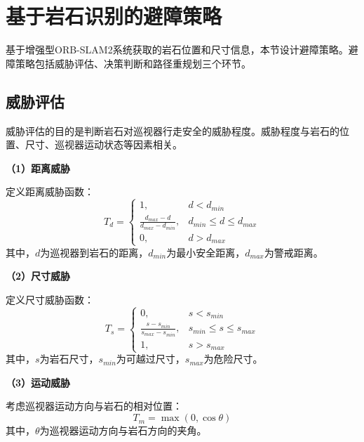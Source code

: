 \section{基于岩石识别的避障策略}
\label{sec:avoidance_strategy}

基于增强型ORB-SLAM2系统获取的岩石位置和尺寸信息，本节设计避障策略。避障策略包括威胁评估、决策判断和路径重规划三个环节。

\subsection{威胁评估}
\label{subsec:threat_assessment}

威胁评估的目的是判断岩石对巡视器行走安全的威胁程度。威胁程度与岩石的位置、尺寸、巡视器运动状态等因素相关。

\textbf{（1）距离威胁}

定义距离威胁函数：
\begin{equation}
    T_d = \begin{cases}
        1, & d < d_{min} \\
        \frac{d_{max} - d}{d_{max} - d_{min}}, & d_{min} \le d \le d_{max} \\
        0, & d > d_{max}
    \end{cases}
    \label{eq:threat_distance}
\end{equation}
其中，$d$为巡视器到岩石的距离，$d_{min}$为最小安全距离，$d_{max}$为警戒距离。

\textbf{（2）尺寸威胁}

定义尺寸威胁函数：
\begin{equation}
    T_s = \begin{cases}
        0, & s < s_{min} \\
        \frac{s - s_{min}}{s_{max} - s_{min}}, & s_{min} \le s \le s_{max} \\
        1, & s > s_{max}
    \end{cases}
    \label{eq:threat_size}
\end{equation}
其中，$s$为岩石尺寸，$s_{min}$为可越过尺寸，$s_{max}$为危险尺寸。

\textbf{（3）运动威胁}

考虑巡视器运动方向与岩石的相对位置：
\begin{equation}
    T_m = \max\left(0, \cos\theta\right)
    \label{eq:threat_motion}
\end{equation}
其中，$\theta$为巡视器运动方向与岩石方向的夹角。

